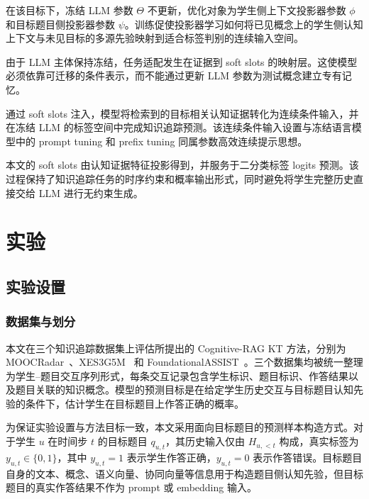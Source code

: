\documentclass[UTF8,a4paper,12pt]{ctexart}
\numberwithin{table}{section}
\begin{document}
在该目标下，冻结 LLM 参数 \(\Theta\) 不更新，优化对象为学生侧上下文投影器参数 \(\phi\) 和目标题目侧投影器参数 \(\psi\)。训练促使投影器学习如何将已见概念上的学生侧认知上下文与未见目标的多源先验映射到适合标签判别的连续输入空间。

由于 LLM 主体保持冻结，任务适配发生在证据到 soft slots 的映射层。这使模型必须依靠可迁移的条件表示，而不能通过更新 LLM 参数为测试概念建立专有记忆。

通过 soft slots 注入，模型将检索到的目标相关认知证据转化为连续条件输入，并在冻结 LLM 的标签空间中完成知识追踪预测。该连续条件输入设置与冻结语言模型中的 prompt tuning 和 prefix tuning 同属参数高效连续提示思想。

本文的 soft slots 由认知证据特征投影得到，并服务于二分类标签 logits 预测\citep{lester2021power,li2021prefixtuning}。该过程保持了知识追踪任务的时序约束和概率输出形式，同时避免将学生完整历史直接交给 LLM 进行无约束生成。

\setcounter{section}{3}
\section{实验}
\subsection{实验设置}


\subsubsection{数据集与划分}

本文在三个知识追踪数据集上评估所提出的 Cognitive-RAG KT 方法，分别为 MOOCRadar~\citep{yu2023moocradar}、XES3G5M~\citep{liu2023xes3g5m} 和 FoundationalASSIST~\citep{worden2026foundationalassist}。三个数据集均被统一整理为学生--题目交互序列形式，每条交互记录包含学生标识、题目标识、作答结果以及题目关联的知识概念。模型的预测目标是在给定学生历史交互与目标题目认知先验的条件下，估计学生在目标题目上作答正确的概率。

为保证实验设置与方法目标一致，本文采用面向目标题目的预测样本构造方式。对于学生 \(u\) 在时间步 \(t\) 的目标题目 \(q_{u,t}\)，其历史输入仅由 \(H_{u,<t}\) 构成，真实标签为 \(y_{u,t} \in \{0,1\}\)，其中 \(y_{u,t}=1\) 表示学生作答正确，\(y_{u,t}=0\) 表示作答错误。目标题目自身的文本、概念、语义向量、协同向量等信息用于构造题目侧认知先验，但目标题目的真实作答结果不作为 prompt 或 embedding 输入。

\begin{table}[H]
\centering
\small
\caption{数据集总体统计}
\label{tab:dataset-split-statistics}
\end{table}
\end{document}
